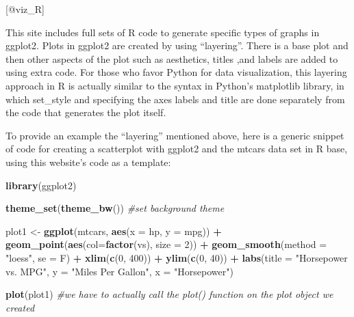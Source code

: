 \documentclass[]{book}
\newenvironment{Shaded}{\begin{snugshade}}{\end{snugshade}}
\newcommand{\KeywordTok}[1]{\textcolor[rgb]{0.13,0.29,0.53}{\textbf{#1}}}
\newcommand{\DataTypeTok}[1]{\textcolor[rgb]{0.13,0.29,0.53}{#1}}
\newcommand{\DecValTok}[1]{\textcolor[rgb]{0.00,0.00,0.81}{#1}}
\newcommand{\StringTok}[1]{\textcolor[rgb]{0.31,0.60,0.02}{#1}}
\newcommand{\CommentTok}[1]{\textcolor[rgb]{0.56,0.35,0.01}{\textit{#1}}}
\newcommand{\OperatorTok}[1]{\textcolor[rgb]{0.81,0.36,0.00}{\textbf{#1}}}
\newcommand{\NormalTok}[1]{#1}
\theoremstyle{definition}
\theoremstyle{definition}
\theoremstyle{definition}
\theoremstyle{remark}
\begin{document}
{[}@viz\_R{]}

This site includes full sets of R code to generate specific types of
graphs in ggplot2. Plots in ggplot2 are created by using ``layering''.
There is a base plot and then other aspects of the plot such as
aesthetics, titles ,and labels are added to using extra code. For those
who favor Python for data visualization, this layering approach in R is
actually similar to the syntax in Python's matplotlib library, in which
set\_style and specifying the axes labels and title are done separately
from the code that generates the plot itself.

To provide an example the ``layering'' mentioned above, here is a
generic snippet of code for creating a scatterplot with ggplot2 and the
mtcars data set in R base, using this website's code as a template:

\begin{Shaded}
\begin{Highlighting}[]
\KeywordTok{library}\NormalTok{(ggplot2)}

\KeywordTok{theme_set}\NormalTok{(}\KeywordTok{theme_bw}\NormalTok{())  }\CommentTok{#set background theme}

\NormalTok{plot1 <-}\StringTok{ }\KeywordTok{ggplot}\NormalTok{(mtcars, }\KeywordTok{aes}\NormalTok{(}\DataTypeTok{x =}\NormalTok{ hp, }\DataTypeTok{y =}\NormalTok{ mpg)) }\OperatorTok{+}\StringTok{ }\KeywordTok{geom_point}\NormalTok{(}\KeywordTok{aes}\NormalTok{(}\DataTypeTok{col=}\KeywordTok{factor}\NormalTok{(vs), }\DataTypeTok{size =} \DecValTok{2}\NormalTok{)) }\OperatorTok{+}\StringTok{ }\KeywordTok{geom_smooth}\NormalTok{(}\DataTypeTok{method =} \StringTok{"loess"}\NormalTok{, }\DataTypeTok{se =}\NormalTok{ F) }\OperatorTok{+}\StringTok{ }\KeywordTok{xlim}\NormalTok{(}\KeywordTok{c}\NormalTok{(}\DecValTok{0}\NormalTok{, }\DecValTok{400}\NormalTok{)) }\OperatorTok{+}\StringTok{ }\KeywordTok{ylim}\NormalTok{(}\KeywordTok{c}\NormalTok{(}\DecValTok{0}\NormalTok{, }\DecValTok{40}\NormalTok{)) }\OperatorTok{+}\StringTok{ }\KeywordTok{labs}\NormalTok{(}\DataTypeTok{title =} \StringTok{"Horsepower vs. MPG"}\NormalTok{, }\DataTypeTok{y =} \StringTok{"Miles Per Gallon"}\NormalTok{, }\DataTypeTok{x =} \StringTok{"Horsepower"}\NormalTok{)}

\KeywordTok{plot}\NormalTok{(plot1)  }\CommentTok{#we have to actually call the plot() function on the plot object we created}
\end{Highlighting}
\end{Shaded}
\end{document}
